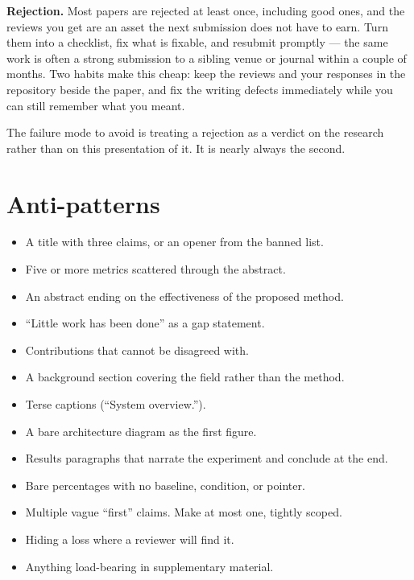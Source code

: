 \documentclass[11pt,a4paper]{article}
\newcommand{\lead}[1]{\medskip\noindent\textbf{#1}\quad}
\begin{document}
\lead{Rejection.} Most papers are rejected at least once, including good
ones, and the reviews you get are an asset the next submission does not have
to earn. Turn them into a checklist, fix what is fixable, and resubmit
promptly --- the same work is often a strong submission to a sibling venue or
journal within a couple of months. Two habits make this cheap: keep the
reviews and your responses in the repository beside the paper, and fix the
writing defects immediately while you can still remember what you meant.

The failure mode to avoid is treating a rejection as a verdict on the
research rather than on this presentation of it. It is nearly always the
second.

\section{Anti-patterns}

\begin{itemize}
  \item A title with three claims, or an opener from the banned list.
  \item Five or more metrics scattered through the abstract.
  \item An abstract ending on the effectiveness of the proposed method.
  \item ``Little work has been done'' as a gap statement.
  \item Contributions that cannot be disagreed with.
  \item A background section covering the field rather than the method.
  \item Terse captions (``System overview.'').
  \item A bare architecture diagram as the first figure.
  \item Results paragraphs that narrate the experiment and conclude at the
    end.
  \item Bare percentages with no baseline, condition, or pointer.
  \item Multiple vague ``first'' claims. Make at most one, tightly scoped.
  \item Hiding a loss where a reviewer will find it.
  \item Anything load-bearing in supplementary material.
\end{itemize}

\end{document}
